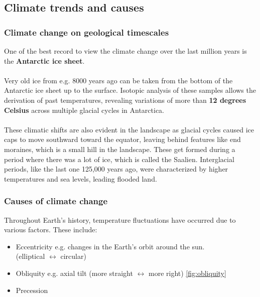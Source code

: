 \documentclass[../summary.tex]{subfiles}
\begin{document}
\subsection{Climate trends and causes}
\subsubsection{Climate change on geological timescales}

One of the best record to view the climate change over the last million years is the \textbf{Antarctic ice sheet}.\\
\\
Very old ice from e.g. 8000 years ago can be taken from the bottom of the Antarctic ice sheet up to the surface. Isotopic analysis of these samples allows the derivation of past temperatures, revealing variations of more than \textbf{12 degrees Celsius} across multiple glacial cycles in Antarctica. \\
\\
These climatic shifts are also evident in the landscape as glacial cycles caused ice caps to move southward toward the equator, leaving behind features like end moraines,  which is a small hill in the landscape. These get formed during a period where there was a lot of ice, which is called the Saalien. Interglacial periods, like the last one 125,000 years ago, were characterized by higher temperatures and sea levels, leading flooded land. 
\newpage
\subsubsection{Causes of climate change}

Throughout Earth's history, temperature fluctuations have occurred due to various factors. These include:
\begin{itemize}
	\item   Eccentricity e.g. changes in the Earth's orbit around the sun. \\
	(elliptical $\leftrightarrow$ circular)
	\item Obliquity e.g. axial tilt (more straight $\leftrightarrow$ more right) \ref{fig:obliquity}
	\item  Precession
\end{itemize}
\end{document}
